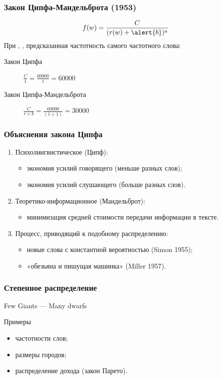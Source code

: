 \documentclass[svgnames]{beamer}
\begin{document}
\begin{frame}
  \frametitle{Закон Ципфа-Мандельброта (1953)}
  \begin{equation}
    f(w) = \frac{C}{(r(w) + \alert{b})^a}
  \end{equation}
  При , , 
  предсказанная частотность самого частотного слова:
  \begin{description}
  \item[Закон Ципфа] $\frac{C}{1}=\frac{60000}{1}=60000$
  \item[Закон Ципфа-Мандельброта] $\frac{C}{r+b}=\frac{60000}{(1+1)}=30000$
  \end{description}
\end{frame}


\begin{frame}
  \frametitle{Объяснения закона Ципфа}
  \begin{enumerate}
  \item Психолингвистическое (Ципф):
    \begin{itemize}
    \item экономия усилий говорящего (меньше разных слов);
    \item экономия усилий слушающего (больше разных слов).
    \end{itemize}
  \item Теоретико-информационное (Мандельброт):
    \begin{itemize}
    \item минимизация средней стоимости передачи информации в тексте.
    \end{itemize}
  \item Процесс, приводящий к подобному распределению:
    \begin{itemize}
    \item новые слова с константной вероятностью (Simon 1955);
    \item «обезьяна и пишущая машинка» (Miller 1957).
    \end{itemize}
  \end{enumerate}
\end{frame}


\begin{frame}
  \frametitle{Степенное распределение}
  
  Few Giants — Many dwarfs

  \begin{block}{Примеры}
  \begin{itemize}
  \item частотности слов;
  \item размеры городов;
  \item распределение дохода (закон Парето).
  \end{itemize}    
  \end{block}
\end{frame}
\end{document}
